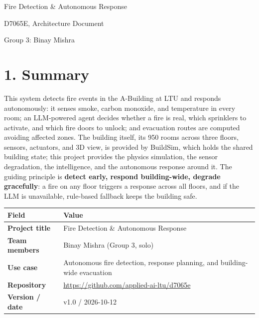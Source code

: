 \documentclass[11pt]{article}
\begin{document}
\begin{center}
{\LARGE Fire Detection \& Autonomous Response\par}
\vspace{0.5em}
{\large D7065E, Architecture Document\par}
\vspace{1em}
{Group 3: Binay Mishra\par}
\end{center}

\vspace{1.2em}

{
\hypersetup{linkcolor=black}
\setcounter{tocdepth}{3}
\tableofcontents
}

\newpage

\section{1. Summary}

This system detects fire events in the A-Building at LTU and responds autonomously: it senses smoke, carbon monoxide, and temperature in every room; an LLM-powered agent decides whether a fire is real, which sprinklers to activate, and which fire doors to unlock; and evacuation routes are computed avoiding affected zones. The building itself, its 950 rooms across three floors, sensors, actuators, and 3D view, is provided by BuildSim, which holds the shared building state; this project provides the physics simulation, the sensor degradation, the intelligence, and the autonomous response around it. The guiding principle is \textbf{detect early, respond building-wide, degrade gracefully}: a fire on any floor triggers a response across all floors, and if the LLM is unavailable, rule-based fallback keeps the building safe.

\begin{longtable}[]{@{}
  >{\raggedright\arraybackslash}p{}
  >{\raggedright\arraybackslash}p{}@{}}
\toprule
\textbf{Field} & \textbf{Value} \\
\midrule
\endhead
\textbf{Project title} & Fire Detection \& Autonomous Response \\
\textbf{Team members} & Binay Mishra (Group 3, solo) \\
\textbf{Use case} & Autonomous fire detection, response planning, and building-wide evacuation \\
\textbf{Repository} & \url{https://github.com/applied-ai-ltu/d7065e} \\
\textbf{Version / date} & v1.0 / 2026-10-12 \\
\bottomrule
\end{longtable}
\end{document}

